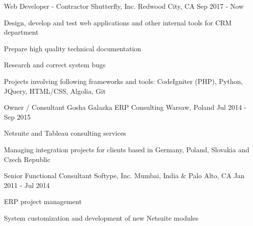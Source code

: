 
\begin{cventries}

	\cventry
		{Web Developer - Contractor}
		{Shutterfly, Inc.} %
		{Redwood City, CA} %
		{Sep 2017 - Now} %
		{
			\begin{cvitems} %
				\item {Design, develop and test web applications and other internal tools for CRM department}
				\item {Prepare high quality technical documentation}
				\item {Research and correct system bugs}
				\item {Projects involving following frameworks and tools: CodeIgniter (PHP), Python, JQuery, HTML/CSS, Algolia, Git}
			\end{cvitems}
		}

	\cventry
		{Owner / Consultant}
		{Gosha Galazka ERP Consulting} %
		{Warsaw, Poland} %
		{Jul 2014 - Sep 2015} %
		{
			\begin{cvitems} %
				\item {Netsuite and Tableau consulting services}
				\item {Managing integration projects for clients based in Germany, Poland, Slovakia and Czech Republic}
			\end{cvitems}
		}


	\cventry
		{Senior Functional Consultant}
		{Softype, Inc.} %
		{Mumbai, India \& Palo Alto, CA} %
		{Jan 2011 - Jul 2014} %
		{
			\begin{cvitems} %
				\item {ERP project management}
				\item {System customization and development of new Netsuite modules}
			\end{cvitems}
		}

\end{cventries}
